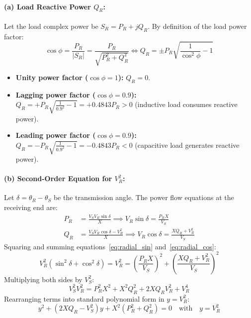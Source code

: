 \paragraph{(a) Load Reactive Power $Q_R$:}
Let the load complex power be $S_R = P_R + j Q_R$. By definition of the load power factor:
\begin{equation}
    \cos\phi = \frac{P_R}{|S_R|} = \frac{P_R}{\sqrt{P_R^2 + Q_R^2}} \iff Q_R = \pm P_R \sqrt{\frac{1}{\cos^2\phi} - 1}
\end{equation}
\begin{itemize}
    \item \textbf{Unity power factor ($\cos\phi = 1$):} $Q_R = 0$.
    \item \textbf{Lagging power factor ($\cos\phi = 0.9$):} $Q_R = + P_R \sqrt{\frac{1}{0.9^2} - 1} = +0.4843 P_R > 0$ (inductive load consumes reactive power).
    \item \textbf{Leading power factor ($\cos\phi = 0.9$):} $Q_R = - P_R \sqrt{\frac{1}{0.9^2} - 1} = -0.4843 P_R < 0$ (capacitive load generates reactive power).
\end{itemize}

\paragraph{(b) Second-Order Equation for $V_R^2$:}
Let $\delta = \theta_R - \theta_S$ be the transmission angle. The power flow equations at the receiving end are:
\begin{align}
    P_R &= \frac{V_S V_R \sin\delta}{X} \implies V_R \sin\delta = \frac{P_R X}{V_S} \label{eq:radial_sin}\\
    Q_R &= \frac{V_S V_R \cos\delta - V_R^2}{X} \implies V_R \cos\delta = \frac{X Q_R + V_R^2}{V_S} \label{eq:radial_cos}
\end{align}
Squaring and summing equations~\eqref{eq:radial_sin} and~\eqref{eq:radial_cos}:
\begin{equation}
    V_R^2 (\sin^2\delta + \cos^2\delta) = V_R^2 = \left(\frac{P_R X}{V_S}\right)^2 + \left(\frac{X Q_R + V_R^2}{V_S}\right)^2
\end{equation}
Multiplying both sides by $V_S^2$:
\begin{equation}
    V_S^2 V_R^2 = P_R^2 X^2 + X^2 Q_R^2 + 2 X Q_R V_R^2 + V_R^4
\end{equation}
Rearranging terms into standard polynomial form in $y = V_R^2$:
\begin{equation}
    \boxed{y^2 + (2X Q_R - V_S^2) y + X^2 (P_R^2 + Q_R^2) = 0\quad \text{with}\quad y = V_R^2}
\end{equation}

